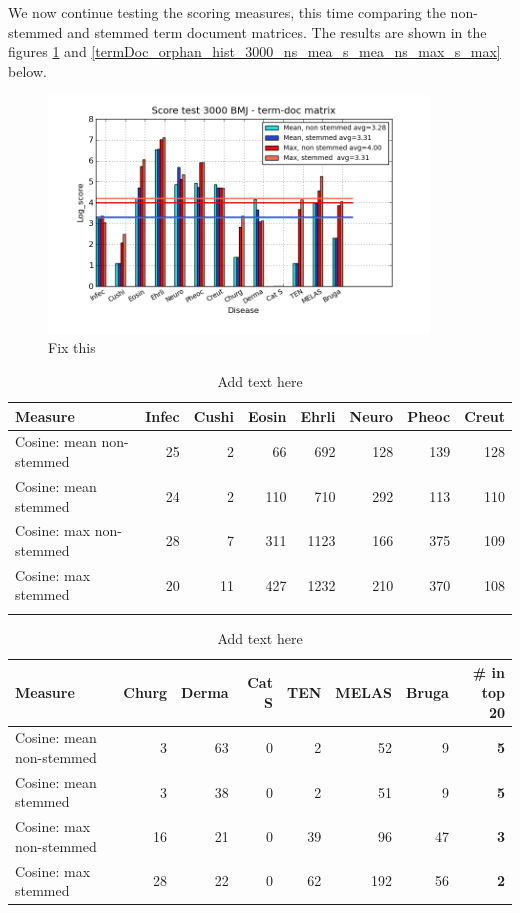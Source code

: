 We now continue testing the scoring measures, this time comparing the
non-stemmed and stemmed term document matrices. The results are shown
in the figures \ref{termDoc_bmj_hist_3000_ns_mea_s_mea_ns_max_s_max}
and \ref{termDoc_orphan_hist_3000_ns_mea_s_mea_ns_max_s_max} below.

\begin{figure}[H]
        \begin{center}
          \includegraphics[width=0.9\textwidth]{barcharts/termDoc_bmj_hist_3000_ns_mea_s_mea_ns_max_s_max.png}
        \end{center}
        \caption{Fix this}
        \label{termDoc_bmj_hist_3000_ns_mea_s_mea_ns_max_s_max}
\end{figure}

\begin{table}[H]
  \begin{tiny}
  \caption{Add text here}
  \label{testResult}
  \begin{tabular}{|l|r|r|r|r|r|r|r|}
    \hline
    Measure &Infec&Cushi&Eosin&Ehrli&Neuro&Pheoc&Creut \\
    \hline
    Cosine: mean non-stemmed &25&2&66&692&128&139&128 \\
    \hline
    Cosine: mean stemmed &24&2&110&710&292&113&110 \\
    \hline
    Cosine: max non-stemmed &28&7&311&1123&166&375&109 \\
    \hline
    Cosine: max stemmed &20&11&427&1232&210&370&108 \\
    \hline
  \multicolumn{8}{c}{} \\
  \end{tabular}
  \begin{tabular}{|l|r|r|r|r|r|r|r|}
    \hline
    Measure &Churg&Derma&Cat S&TEN&MELAS&Bruga& \scriptsize{\textbf{\# in top 20}} \\
    \hline
    Cosine: mean non-stemmed &3&63&0&2&52&9& \scriptsize{\textbf{5}} \\
    \hline
    Cosine: mean stemmed &3&38&0&2&51&9& \scriptsize{\textbf{5}}\\
    \hline
    Cosine: max non-stemmed &16&21&0&39&96&47& \scriptsize{\textbf{3}} \\
    \hline
    Cosine: max stemmed &28&22&0&62&192&56& \scriptsize{\textbf{2}} \\
    \hline
  \end{tabular}
  \end{tiny}
\end{table}

